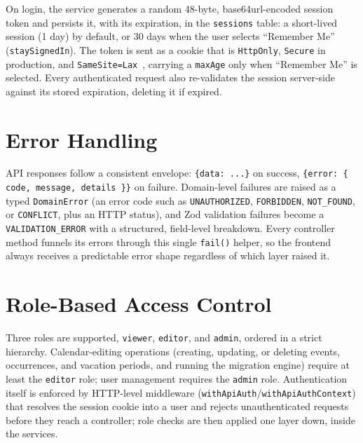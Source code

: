 On login, the service generates a random 48-byte, base64url-encoded session token and persists it, with its expiration, in the \texttt{sessions} table: a short-lived session (1 day) by default, or 30 days when the user selects ``Remember Me'' (\texttt{staySignedIn}). The token is sent as a cookie that is \texttt{HttpOnly}, \texttt{Secure} in production, and \texttt{SameSite=Lax}~\cite{owasp}, carrying a \texttt{maxAge} only when ``Remember Me'' is selected. Every authenticated request also re-validates the session server-side against its stored expiration, deleting it if expired.

\section{Error Handling} \label{sec:backend-error-handling}

API responses follow a consistent envelope: \texttt{\{data: ...\}} on success, \texttt{\{error: \{ code, message, details \}\}} on failure. Domain-level failures are raised as a typed \texttt{DomainError} (an error code such as \texttt{UNAUTHORIZED}, \texttt{FORBIDDEN}, \texttt{NOT\_FOUND}, or \texttt{CONFLICT}, plus an HTTP status), and Zod validation failures become a \texttt{VALIDATION\_ERROR} with a structured, field-level breakdown. Every controller method funnels its errors through this single \texttt{fail()} helper, so the frontend always receives a predictable error shape regardless of which layer raised it.

\section{Role-Based Access Control} \label{sec:backend-rbac}

Three roles are supported, \texttt{viewer}, \texttt{editor}, and \texttt{admin}, ordered in a strict hierarchy. Calendar-editing operations (creating, updating, or deleting events, occurrences, and vacation periods, and running the migration engine) require at least the \texttt{editor} role; user management requires the \texttt{admin} role. Authentication itself is enforced by HTTP-level middleware (\texttt{withApiAuth}/\texttt{withApiAuthContext}) that resolves the session cookie into a user and rejects unauthenticated requests before they reach a controller; role checks are then applied one layer down, inside the services.

